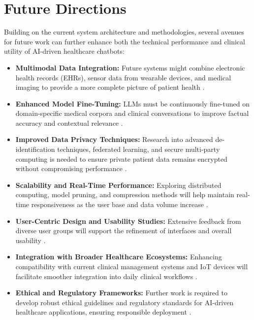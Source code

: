 \section{Future Directions}
\label{sec:future_directions}

Building on the current system architecture and methodologies, several avenues for future work can further enhance both the technical performance and clinical utility of AI-driven healthcare chatbots:
\begin{itemize}[itemsep=2em]
    \item \textbf{Multimodal Data Integration:} Future systems might combine electronic health records (EHRs), sensor data from wearable devices, and medical imaging to provide a more complete picture of patient health \cite{park2024}.
    \item \textbf{Enhanced Model Fine-Tuning:} LLMs must be continuously fine-tuned on domain-specific medical corpora and clinical conversations to improve factual accuracy and contextual relevance \cite{llama2023}.
    \item \textbf{Improved Data Privacy Techniques:} Research into advanced de-identification techniques, federated learning, and secure multi-party computing is needed to ensure private patient data remains encrypted without compromising performance \cite{pan2020}.
    \item \textbf{Scalability and Real-Time Performance:} Exploring distributed computing, model pruning, and compression methods will help maintain real-time responsiveness as the user base and data volume increase \cite{qiu2023}.
    \item \textbf{User-Centric Design and Usability Studies:} Extensive feedback from diverse user groups will support the refinement of interfaces and overall usability \cite{dineen2019}.
    \item \textbf{Integration with Broader Healthcare Ecosystems:} Enhancing compatibility with current clinical management systems and IoT devices will facilitate smoother integration into daily clinical workflows \cite{ayers2023}.
    \item \textbf{Ethical and Regulatory Frameworks:} Further work is required to develop robust ethical guidelines and regulatory standards for AI-driven healthcare applications, ensuring responsible deployment \cite{harding2023, ueda2024}.
\end{itemize}

